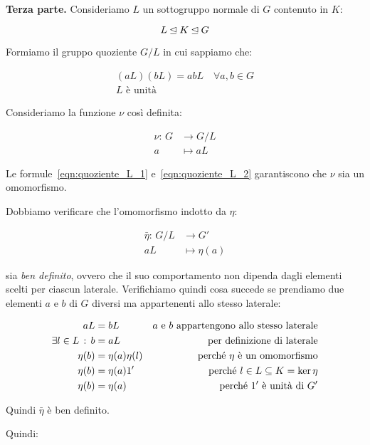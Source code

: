 \begin{dimostrazione}
	\textbf{Terza parte.}
	Consideriamo $L$ un sottogruppo normale di $G$ contenuto in $K$:
	
	\begin{equation}
		L \unlhd K \unlhd G
	\end{equation}

	Formiamo il gruppo quoziente $G/L$ in cui sappiamo che:
	
	\begin{gather}
		\label{eqn:quoziente_L_1} (aL)(bL) = abL \quad \forall a, b \in G \\
		\label{eqn:quoziente_L_2}L \text{ è unità}
	\end{gather}

	Consideriamo la funzione $\nu$ così definita:
	
	\begin{align}
		\nu:\, G &\longrightarrow G/L \\
		a &\longmapsto aL
	\end{align}

	Le formule~\eqref{eqn:quoziente_L_1} e~\eqref{eqn:quoziente_L_2} garantiscono che $\nu$ sia un omomorfismo.

	Dobbiamo verificare che l'omomorfismo indotto da $\eta$:
	
	\begin{align}
		\bar{\eta}:\, G/L &\longrightarrow G' \\
		aL &\longmapsto \eta(a)
	\end{align}
	
	sia \emph{ben definito}, ovvero che il suo comportamento non dipenda dagli elementi scelti per ciascun laterale. Verifichiamo quindi cosa succede se prendiamo due elementi $a$ e $b$ di $G$ diversi ma appartenenti allo stesso laterale:
	
	\begin{align}
		aL &= bL &\text{$a$ e $b$ appartengono allo stesso laterale} \\
		\exists l \in L \,:\, b &= aL &\text{per definizione di laterale} \\
		\eta(b) &= \eta(a)\eta(l) &\text{perché $\eta$ è un omomorfismo} \\
		\eta(b) &= \eta(a) 1' &\text{perché $l \in L \subseteq K = \ker \eta$} \\
		\eta(b) &= \eta(a) &\text{perché $1'$ è unità di $G'$}
	\end{align} 
	
	Quindi $\bar{\eta}$ è ben definito.
	
	Quindi:
	

\end{dimostrazione}
